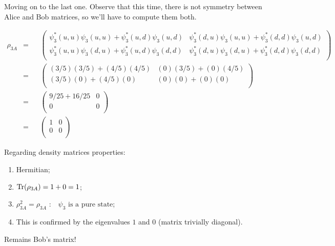 \documentclass[solutions.tex]{subfiles}
\begin{document}
\hr

Moving on to the last one. Observe that this time, there is not symmetry
between Alice and Bob matrices, so we'll have to compute them both.

\begin{equation*}\begin{aligned}
	\rho_{3A} &=&& \begin{pmatrix}
		\psi_3^*(u,u)\psi_3(u,u) + \psi_3^*(u,d)\psi_3(u,d) &
			\psi_3^*(d,u)\psi_3(u,u) + \psi_3^*(d,d)\psi_3(u,d) \\
		\psi_3^*(u,u)\psi_3(d,u) + \psi_3^*(u,d)\psi_3(d,d)&
			\psi_3^*(d,u)\psi_3(d,u) + \psi_3^*(d,d)\psi_3(d,d) \\
	\end{pmatrix} \\
	~ &=&& \begin{pmatrix}
		(3/5)(3/5) + (4/5)(4/5) & (0)(3/5) + (0)(4/5) \\
		(3/5)(0) + (4/5)(0) & (0)(0) + (0)(0) \\
	\end{pmatrix} \\
	~ &=&& \begin{pmatrix}
		9/25+16/25 & 0 \\
		0 & 0 \\
	\end{pmatrix} \\
	&=&& \boxed{\begin{pmatrix}
		1 & 0 \\
		0 & 0 \\
	\end{pmatrix}}
\end{aligned}\end{equation*}

Regarding density matrices properties:
\begin{enumerate}
	\item Hermitian;
	\item $\text{Tr}(\rho_{3A}) = 1+0 = 1$;
	\item $\rho_{3A}^2 = \rho_{3A}$ : $\boxed{\text{ $\psi_3$ is a pure
	state}}$;
	\item This is confirmed by the eigenvalues $1$ and $0$ (matrix
	trivially diagonal).
\end{enumerate}

Remains Bob's matrix!
\end{document}
